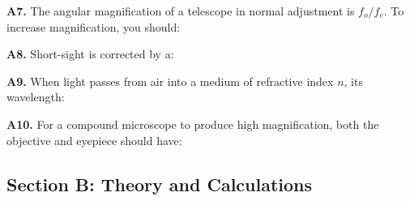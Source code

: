 \begin{exercisebox}[20]
\vspace{0.4cm}

\textbf{A7.} The angular magnification of a
telescope in normal adjustment is $f_o/f_e$. To
increase magnification, you should:


\vspace{0.4cm}

\textbf{A8.} Short-sight is corrected by a:


\vspace{0.4cm}

\textbf{A9.} When light passes from air into a
medium of refractive index $n$, its wavelength:


\vspace{0.4cm}

\textbf{A10.} For a compound microscope to produce
high magnification, both the objective and eyepiece
should have:


\vspace{0.6cm}

\subsection*{Section B: Theory and Calculations}


\end{exercisebox}
